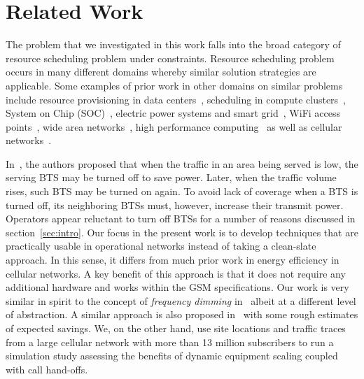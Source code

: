 \section{Related Work}
\label{sec:related} 
The problem that we investigated in this work falls into the broad category of resource scheduling problem under constraints. Resource scheduling problem occurs in many different domains whereby similar solution strategies are applicable. Some examples of prior work in other domains on similar problems include resource provisioning in data centers~\cite{Jeyarani:2012:DIA:2148243.2148374,serverEnergy,Mazzucco:Maximizing:2011:CoRR,Oh:2011:ECS:2170444.2170458,Chase:2001:MES:502059.502045}, scheduling in compute clusters~\cite{AlDaoud2012745}, System on Chip (SOC)~\cite{Fang:2011:COP:1995896.1995940}, electric power systems and smart grid~\cite{Javed:2008:ULP:1485753.1485792,Logenthiran2011138,Celli:2001:PICA,FahadJavedAdOpt.SASO.2009.26}, WiFi access points~\cite{Marsan:2010:SAM:1791314.1791340}, wide area networks~\cite{Cavdar:2011:ECOC}, high performance computing~\cite{Lee:ServerConsolidation:2011:Globecom,Pinheiro01loadbalancing,Yao:DCPowerReduction:2012:INFOCOM,Herodotou:Starfish:2011:CIDR,Herodotou:2011:NOS:2038916.2038934,Aikema:ElecCostHPC:2011:ISSST} as well as cellular networks~\cite{Peng:2011:BTSSaving:Mobicom,Tipper:Dimming:Globecom:2010,Blume:2010:BLTJ:CellularPower}.

In~\cite{Peng:2011:BTSSaving:Mobicom}, the authors proposed that when the traffic in an area being served is low, the serving BTS may be turned off to save power. Later, when the traffic volume rises, such BTS may be turned on again. To avoid lack of coverage when a BTS is turned off, its neighboring BTSs must, however, increase their transmit power. Operators appear reluctant to turn off BTSs for a number of reasons discussed in section~\ref{sec:intro}. Our focus in the present work is to develop techniques that are practically usable in operational networks instead of taking a clean-slate approach. In this sense, it differs from much prior work in energy efficiency in cellular networks. A key benefit of this approach is that it 
does not require any additional hardware
and works within the GSM specifications. Our
work is very similar in spirit to the concept of
\textit{frequency dimming}
in~\cite{Tipper:Dimming:Globecom:2010} albeit at a different
level of abstraction. A similar approach is also proposed
in~\cite{Blume:2010:BLTJ:CellularPower} with some rough
estimates of expected savings. We, on the other hand, use site
locations and traffic traces from a large cellular network with
more than 13 million subscribers to run a simulation study
assessing the benefits of dynamic equipment scaling coupled
with call hand-offs. 